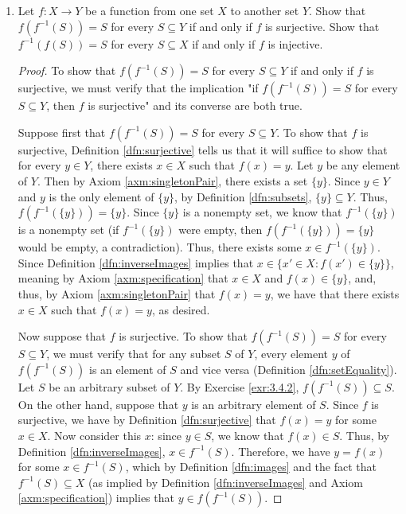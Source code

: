 \documentclass[../main.tex]{subfiles}
\begin{document}
\begin{enumerate}[ref={\thesection.\arabic*}]
\begin{proof}
\begin{align*}
        \end{align*}
    \end{proof}
    \item \label{exr:3.4.5}Let $f:X\to Y$ be a function from one set $X$ to another set $Y$. Show that $f(f^{-1}(S))=S$ for every $S\subseteq Y$ if and only if $f$ is surjective. Show that $f^{-1}(f(S))=S$ for every $S\subseteq X$ if and only if $f$ is injective.
    \begin{proof}
        To show that $f(f^{-1}(S))=S$ for every $S\subseteq Y$ if and only if $f$ is surjective, we must verify that the implication "if $f(f^{-1}(S))=S$ for every $S\subseteq Y$, then $f$ is surjective" and its converse are both true.\par
        Suppose first that $f(f^{-1}(S))=S$ for every $S\subseteq Y$. To show that $f$ is surjective, Definition \ref{dfn:surjective} tells us that it will suffice to show that for every $y\in Y$, there exists $x\in X$ such that $f(x)=y$. Let $y$ be any element of $Y$. Then by Axiom \ref{axm:singletonPair}, there exists a set $\{y\}$. Since $y\in Y$ and $y$ is the only element of $\{y\}$, by Definition \ref{dfn:subsets}, $\{y\}\subseteq Y$. Thus, $f(f^{-1}(\{y\}))=\{y\}$. Since $\{y\}$ is a nonempty set, we know that $f^{-1}(\{y\})$ is a nonempty set (if $f^{-1}(\{y\})$ were empty, then $f(f^{-1}(\{y\}))=\{y\}$ would be empty, a contradiction). Thus, there exists some $x\in f^{-1}(\{y\})$. Since Definition \ref{dfn:inverseImages} implies that $x\in\{x'\in X:f(x')\in\{y\}\}$, meaning by Axiom \ref{axm:specification} that $x\in X$ and $f(x)\in\{y\}$, and, thus, by Axiom \ref{axm:singletonPair} that $f(x)=y$, we have that there exists $x\in X$ such that $f(x)=y$, as desired.\par
        Now suppose that $f$ is surjective. To show that $f(f^{-1}(S))=S$ for every $S\subseteq Y$, we must verify that for any subset $S$ of $Y$, every element $y$ of $f(f^{-1}(S))$ is an element of $S$ and vice versa (Definition \ref{dfn:setEquality}). Let $S$ be an arbitrary subset of $Y$. By Exercise \ref{exr:3.4.2}, $f(f^{-1}(S))\subseteq S$. On the other hand, suppose that $y$ is an arbitrary element of $S$. Since $f$ is surjective, we have by Definition \ref{dfn:surjective} that $f(x)=y$ for some $x\in X$. Now consider this $x$: since $y\in S$, we know that $f(x)\in S$. Thus, by Definition \ref{dfn:inverseImages}, $x\in f^{-1}(S)$. Therefore, we have $y=f(x)$ for some $x\in f^{-1}(S)$, which by Definition \ref{dfn:images} and the fact that $f^{-1}(S)\subseteq X$ (as implied by Definition \ref{dfn:inverseImages} and Axiom \ref{axm:specification}) implies that $y\in f(f^{-1}(S))$.\par\medskip

\end{proof}
\end{enumerate}
\end{document}
